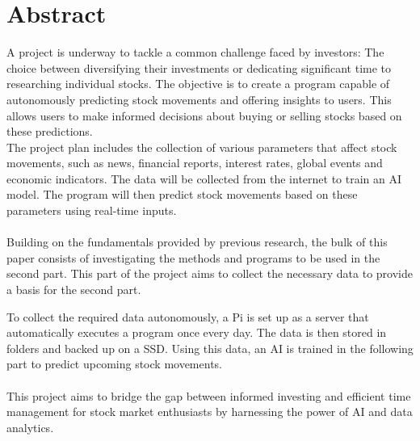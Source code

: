 \section*{Abstract}\label{sec: Abstract}

A project is underway to tackle a common challenge faced by investors: The choice between diversifying their investments or dedicating significant time to researching individual stocks. The objective is to create a program capable of autonomously predicting stock movements and offering insights to users. This allows users to make informed decisions about buying or selling stocks based on these predictions.\\
The project plan includes the collection of various parameters that affect stock movements, such as news, financial reports, interest rates, global events and economic indicators. The data will be collected from the internet to train an \ac{AI} model. The program will then predict stock movements based on these parameters using real-time inputs.\\
\\
Building on the fundamentals provided by previous research, the bulk of this paper consists of investigating the methods and programs to be used in the second part. This part of the project aims to collect the necessary data to provide a basis for the second part.

To collect the required data autonomously, a \ac{Pi} is set up as a server that automatically executes a program once every day. The data is then stored in folders and backed up on a \ac{SSD}.
Using this data, an \ac{AI} is trained in the following part to predict upcoming stock movements.\\
\\
This project aims to bridge the gap between informed investing and efficient time management for stock market enthusiasts by harnessing the power of \ac{AI} and data analytics.
\newpage